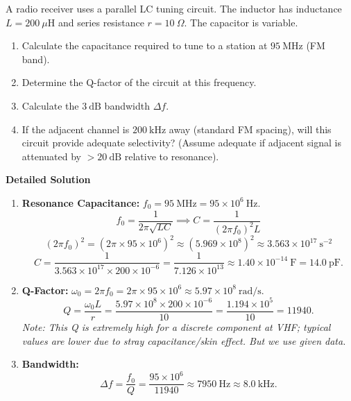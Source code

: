 \documentclass[11pt]{article}
\begin{document}
\begin{exoresolu}
A radio receiver uses a parallel LC tuning circuit. The inductor has inductance $L = 200\ \mu\mathrm{H}$ and series resistance $r = 10\ \Omega$. The capacitor is variable.
\begin{enumerate}
\item Calculate the capacitance required to tune to a station at $95\ \mathrm{MHz}$ (FM band).
\item Determine the Q-factor of the circuit at this frequency.
\item Calculate the $3\ \mathrm{dB}$ bandwidth $\Delta f$.
\item If the adjacent channel is $200\ \mathrm{kHz}$ away (standard FM spacing), will this circuit provide adequate selectivity? (Assume adequate if adjacent signal is attenuated by $> 20\ \mathrm{dB}$ relative to resonance).
\end{enumerate}
\tcblower
\textbf{Detailed Solution}
\begin{enumerate}
\item \textbf{Resonance Capacitance:}
$f_0 = 95\ \mathrm{MHz} = 95 \times 10^6\ \mathrm{Hz}$.
\[
f_0 = \frac{1}{2\pi\sqrt{LC}} \implies C = \frac{1}{(2\pi f_0)^2 L}
\]
\[
(2\pi f_0)^2 = (2\pi \times 95 \times 10^6)^2 \approx (5.969 \times 10^8)^2 \approx 3.563 \times 10^{17}\ \mathrm{s^{-2}}
\]
\[
C = \frac{1}{3.563 \times 10^{17} \times 200 \times 10^{-6}} = \frac{1}{7.126 \times 10^{13}} \approx 1.40 \times 10^{-14}\ \mathrm{F} = 14.0\ \mathrm{pF}.
\]

\item \textbf{Q-Factor:}
$\omega_0 = 2\pi f_0 = 2\pi \times 95 \times 10^6 \approx 5.97 \times 10^8\ \mathrm{rad/s}$.
\[
Q = \frac{\omega_0 L}{r} = \frac{5.97 \times 10^8 \times 200 \times 10^{-6}}{10} = \frac{1.194 \times 10^5}{10} = 11940.
\]
\textit{Note: This Q is extremely high for a discrete component at VHF; typical values are lower due to stray capacitance/skin effect. But we use given data.}

\item \textbf{Bandwidth:}
\[
\Delta f = \frac{f_0}{Q} = \frac{95 \times 10^6}{11940} \approx 7950\ \mathrm{Hz} \approx 8.0\ \mathrm{kHz}.
\]


\end{enumerate}
\end{exoresolu}
\end{document}
